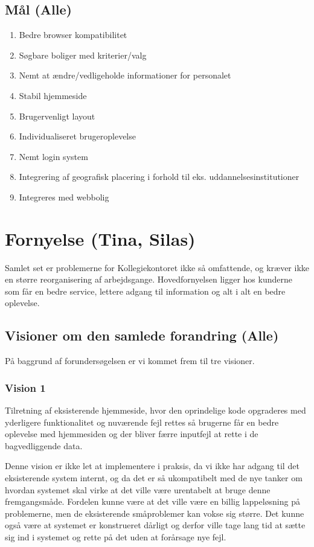 \documentclass[12pt, a4paper]{report}
\begin{document}
\FloatBarrier
\subsection{Mål (Alle)}
\begin{enumerate}
\item Bedre browser kompatibilitet
\item Søgbare boliger med kriterier/valg
\item Nemt at ændre/vedligeholde informationer for personalet
\item Stabil hjemmeside
\item Brugervenligt layout
\item Individualiseret brugeroplevelse
\item Nemt login system
\item Integrering af geografisk placering i forhold til eks. uddannelsesinstitutioner
\item Integreres med webbolig
\end{enumerate}

\section{Fornyelse (Tina, Silas)}
Samlet set er problemerne for Kollegiekontoret ikke så omfattende, og kræver ikke en større reorganisering af arbejdsgange. Hovedfornyelsen ligger hos kunderne som får en bedre service, lettere adgang til information og alt i alt en bedre oplevelse.

\subsection{Visioner om den samlede forandring (Alle)}
På baggrund af forundersøgelsen er vi kommet frem til tre visioner.

\subsubsection{Vision 1}
Tilretning af eksisterende hjemmeside, hvor den oprindelige kode opgraderes med yderligere funktionalitet og nuværende fejl rettes så brugerne får en bedre oplevelse med hjemmesiden og der bliver færre inputfejl at rette i de bagvedliggende data.

Denne vision er ikke let at implementere i praksis, da vi ikke har adgang til det eksisterende system internt, og da det er så ukompatibelt med de nye tanker om hvordan systemet skal virke at det ville være urentabelt at bruge denne fremgangsmåde. Fordelen kunne være at det ville være en billig lappeløsning på problemerne, men de eksisterende småproblemer kan vokse sig større. Det kunne også være at systemet er konstrueret dårligt og derfor ville tage lang tid at sætte sig ind i systemet og rette på det uden at forårsage nye fejl.
\end{document}
